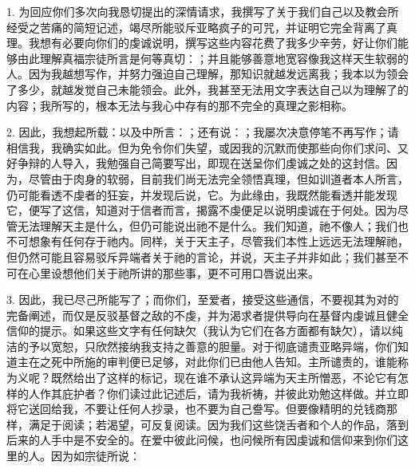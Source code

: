 1. 为回应你们多次向我恳切提出的深情请求，我撰写了关于我们自己以及教会所经受之苦痛的简短记述，竭尽所能驳斥亚略疯子的可咒，并证明它完全背离了真理。我想有必要向你们的虔诚说明，撰写这些内容花费了我多少辛劳，好让你们能够由此理解真福宗徒所言是何等真切：；并且能够善意地宽容像我这样天生软弱的人。因为我越想写作，并努力强迫自己理解，那知识就越发远离我；我本以为领会了多少，就越发觉自己未能领会。此外，我甚至无法用文字表达自己以为理解了的内容；我所写的，根本无法与我心中存有的那不完全的真理之影相称。\par

2. 因此，我想起所载：以及中所言：；还有说：；我屡次决意停笔不再写作；请相信我，我确实如此。但为免令你们失望，或因我的沉默而使那些向你们求问、又好争辩的人导入，我勉强自己简要写出，即现在送呈你们虔诚之处的这封信。因为，尽管由于肉身的软弱，目前我们尚无法完全领悟真理，但如训道者本人所言，仍可能看透不虔者的狂妄，并发现后说，它。为此缘由，我既然能看透并能发现它，便写了这信，知道对于信者而言，揭露不虔便足以说明虔诚在于何处。因为尽管无法理解天主是什么，但仍可能说出祂不是什么。我们知道，祂不像人；我们也不可想象有任何存于祂内。同样，关于天主子，尽管我们本性上远远无法理解祂，但仍然可能且容易驳斥异端者关于祂的言论，并说，天主子并非如此；我们甚至不可在心里设想他们关于祂所讲的那些事，更不可用口唇说出来。\par

3. 因此，我已尽己所能写了；而你们，至爱者，接受这些通信，不要视其为对的完备阐述，而仅是反驳基督之敌的不虔，并为渴求者提供导向在基督内虔诚且健全信仰的提示。如果这些文字有任何缺欠（我认为它们在各方面都有缺欠），请以纯洁的予以宽恕，只欣然接纳我支持之善意的胆量。对于彻底谴责亚略异端，你们知道主在之死中所施的审判便已足够，对此你们已由他人告知。主所谴责的，谁能称为义呢？既然给出了这样的标记，现在谁不承认这异端为天主所憎恶，不论它有怎样的人作其庇护者？你们读过此记述后，请为我祈祷，并彼此劝勉这样做。并立即将它送回给我，不要让任何人抄录，也不要为自己誊写。但要像精明的兑钱商那样，满足于阅读；若渴望，可反复阅读。因为我们这些饶舌者和个人的作品，落到后来的人手中是不安全的。在爱中彼此问候，也问候所有因虔诚和信仰来到你们这里的人。因为如宗徒所说：\par

